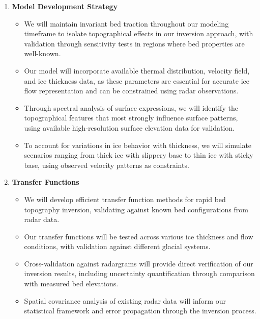 \begin{enumerate}
\item\textbf{Model Development Strategy}
    \begin{itemize}
    \item We will maintain invariant bed traction throughout our modeling timeframe to isolate topographical effects in our inversion approach, with validation through sensitivity tests in regions where bed properties are well-known.
    
    \item Our model will incorporate available thermal distribution, velocity field, and ice thickness data, as these parameters are essential for accurate ice flow representation and can be constrained using radar observations.
    
    \item Through spectral analysis of surface expressions, we will identify the topographical features that most strongly influence surface patterns, using available high-resolution surface elevation data for validation.
    
    \item To account for variations in ice behavior with thickness, we will simulate scenarios ranging from thick ice with slippery base to thin ice with sticky base, using observed velocity patterns as constraints.
    \end{itemize}

\item\textbf{Transfer Functions}
    \begin{itemize}
    \item We will develop efficient transfer function methods for rapid bed topography inversion, validating against known bed configurations from radar data.
    
    \item Our transfer functions will be tested across various ice thickness and flow conditions, with validation against different glacial systems.
    
    \item Cross-validation against radargrams will provide direct verification of our inversion results, including uncertainty quantification through comparison with measured bed elevations.
    
    \item Spatial covariance analysis of existing radar data will inform our statistical framework and error propagation through the inversion process.
    

\end{itemize}
\end{enumerate}
